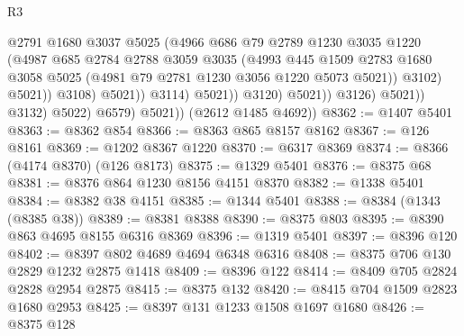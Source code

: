 \begin{lexlean}{R3}
\begin{coremodule}
                                          @2791
                                          @1680
                                          @3037
                                          @5025
                                          (@4966
                                            @686
                                            @79
                                            @2789
                                            @1230
                                            @3035
                                            @1220
                                            (@4987
                                              @685
                                              @2784
                                              @2788
                                              @3059
                                              @3035
                                              (@4993
                                                @445
                                                @1509
                                                @2783
                                                @1680
                                                @3058
                                                @5025
                                                (@4981 @79 @2781 @1230 @3056 @1220 @5073 @5021))
                                              @3102)
                                            @5021))
                                        @3108)
                                      @5021))
                                  @3114)
                                @5021))
                            @3120)
                          @5021))
                      @3126)
                    @5021))
                @3132)
              @5022)
            @6579)
          @5021))
      (@2612 @1485 @4692))
@8362 := @1407 @5401
@8363 := @8362 @854
@8366 := @8363 @865 @8157 @8162
@8367 := @126 @8161
@8369 := @1202 @8367 @1220
@8370 := @6317 @8369
@8374 := @8366 (@4174 @8370) (@126 @8173)
@8375 := @1329 @5401
@8376 := @8375 @68
@8381 := @8376 @864 @1230 @8156 @4151 @8370
@8382 := @1338 @5401
@8384 := @8382 @38 @4151
@8385 := @1344 @5401
@8388 := @8384 (@1343 (@8385 @38))
@8389 := @8381 @8388
@8390 := @8375 @803
@8395 := @8390 @863 @4695 @8155 @6316 @8369
@8396 := @1319 @5401
@8397 := @8396 @120
@8402 := @8397 @802 @4689 @4694 @6348 @6316
@8408 := @8375 @706 @130 @2829 @1232 @2875 @1418
@8409 := @8396 @122
@8414 := @8409 @705 @2824 @2828 @2954 @2875
@8415 := @8375 @132
@8420 := @8415 @704 @1509 @2823 @1680 @2953
@8425 := @8397 @131 @1233 @1508 @1697 @1680
@8426 := @8375 @128

\end{coremodule}
\end{lexlean}
